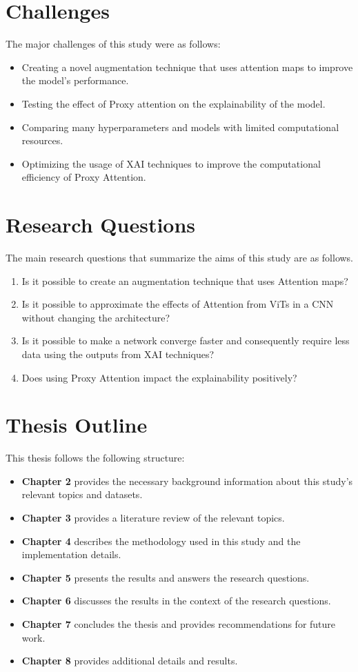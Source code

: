 \section{Challenges}
The major challenges of this study were as follows:
\begin{itemize}
    \item Creating a novel augmentation technique that uses attention maps to improve the model's performance.
    \item Testing the effect of Proxy attention on the explainability of the model.
    \item Comparing many hyperparameters and models with limited computational resources.
    \item Optimizing the usage of XAI techniques to improve the computational efficiency of Proxy Attention.
\end{itemize}

\section{Research Questions} \label{section:researchq}
The main research questions that summarize the aims of this study are as follows.
\begin{enumerate}
    \item Is it possible to create an augmentation technique that uses Attention maps?
    \item Is it possible to approximate the effects of Attention from ViTs in a CNN without changing the architecture?
    \item Is it possible to make a network converge faster and consequently require less data using the outputs from XAI techniques?
    \item Does using Proxy Attention impact the explainability positively?
\end{enumerate}
\section{Thesis Outline}
This thesis follows the following structure:
\begin{itemize}
    \item \textbf{Chapter 2} provides the necessary background information about this study's relevant topics and datasets.
    \item \textbf{Chapter 3} provides a literature review of the relevant topics.
    \item \textbf{Chapter 4} describes the methodology used in this study and the implementation details.
    \item \textbf{Chapter 5} presents the results and answers the research questions.
    \item \textbf{Chapter 6} discusses the results in the context of the research questions.
    \item \textbf{Chapter 7} concludes the thesis and provides recommendations for future work.
    \item \textbf{Chapter 8} provides additional details and results.
\end{itemize}